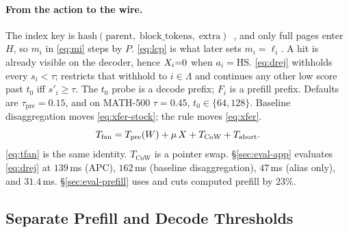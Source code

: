 \paragraph{From the action to the wire.}
The index key is $\mathrm{hash}(\mathrm{parent},\;\mathrm{block\_tokens},\;\mathrm{extra})$~\cite{vllm}, and only full pages enter $H$, so $m_i$ in \eqref{eq:mi} steps by $P$.
\eqref{eq:lcp} is what later sets $m_i{=}\ell_i$.
A hit is already visible on the decoder, hence $X_i{=}0$ when $a_i{=}\mathrm{HS}$.
\eqref{eq:drej} withholds every $s_i{<}\tau$;  restricts that withhold to $i{\in}\Lambda$ and continues any other low score past $t_0$ iff $s'_i{\ge}\tau$.
The $t_0$ probe is a decode prefix; $F_i$ is a prefill prefix.
Defaults are $\tau_{\mathrm{pre}}{=}0.15$, and on MATH-500 $\tau{=}0.45$, $t_0{\in}\{64,128\}$.
Baseline disaggregation moves \eqref{eq:xfer-stock}; the rule moves \eqref{eq:xfer}.
\begin{equation}
\label{eq:tfan-iv}
T_{\mathrm{fan}}=T_{\mathrm{pre}}(W)+\mu\,X+T_{\mathrm{CoW}}+T_{\mathrm{abort}}.
\end{equation}
\eqref{eq:tfan} is the same identity.
$T_{\mathrm{CoW}}$ is a pointer swap.
\S\ref{sec:eval-app} evaluates \eqref{eq:drej} at $139$\,ms (APC), $162$\,ms (baseline disaggregation), $47$\,ms (alias only), and $31.4$\,ms.
\S\ref{sec:eval-prefill} uses  and cuts computed prefill by $23\%$.

\subsection{Separate Prefill and Decode Thresholds}
\label{sec:split-detail}

